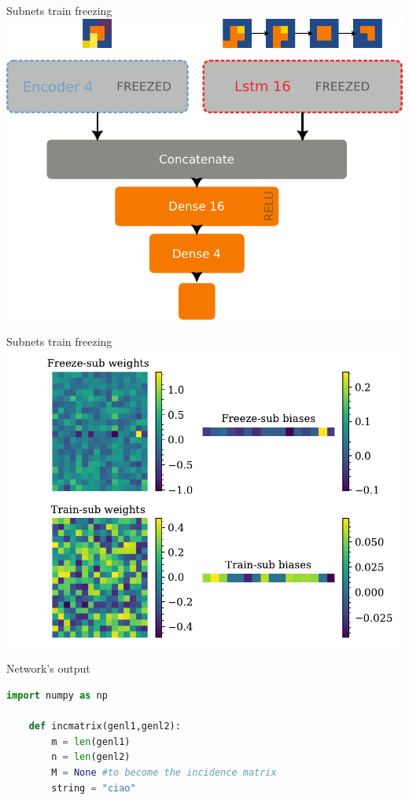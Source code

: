 \documentclass{beamer}
\begin{document}
\begin{frame}{Subnets train freezing}
    \includegraphics[width=.8\linewidth]{figures/freezetraining_2.pdf}
\end{frame}

\begin{frame}{Subnets train freezing}
    \includegraphics[width=.8\linewidth]{figures/freezetraining.pdf}
\end{frame}

\begin{frame}[fragile]{Network's output}
    \begin{lstlisting}[language=Python]
    import numpy as np
        
    def incmatrix(genl1,genl2):
        m = len(genl1)
        n = len(genl2)
        M = None #to become the incidence matrix
        string = "ciao"
      
    \end{lstlisting}

    
\end{frame}
\end{document}
